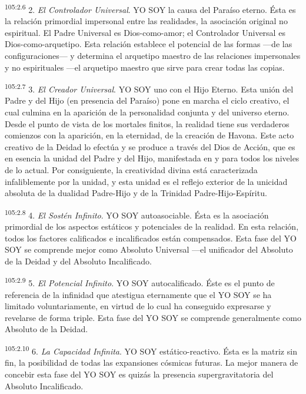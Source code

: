 \par
\textsuperscript{105:2.6} 2. \textit{El Controlador Universal}. YO SOY la causa del Paraíso eterno. Ésta es la relación primordial impersonal entre las realidades, la asociación original no espiritual. El Padre Universal es Dios-como-amor; el Controlador Universal es Dios-como-arquetipo. Esta relación establece el potencial de las formas ---de las configuraciones--- y determina el arquetipo maestro de las relaciones impersonales y no espirituales ---el arquetipo maestro que sirve para crear todas las copias.

\par
\textsuperscript{105:2.7} 3. \textit{El Creador Universal}. YO SOY uno con el Hijo Eterno. Esta unión del Padre y del Hijo (en presencia del Paraíso) pone en marcha el ciclo creativo, el cual culmina en la aparición de la personalidad conjunta y del universo eterno. Desde el punto de vista de los mortales finitos, la realidad tiene sus verdaderos comienzos con la aparición, en la eternidad, de la creación de Havona. Este acto creativo de la Deidad lo efectúa y se produce a través del Dios de Acción, que es en esencia la unidad del Padre y del Hijo, manifestada en y para todos los niveles de lo actual. Por consiguiente, la creatividad divina está caracterizada infaliblemente por la unidad, y esta unidad es el reflejo exterior de la unicidad absoluta de la dualidad Padre-Hijo y de la Trinidad Padre-Hijo-Espíritu.

\par
\textsuperscript{105:2.8} 4. \textit{El Sostén Infinito}. YO SOY autoasociable. Ésta es la asociación primordial de los aspectos estáticos y potenciales de la realidad. En esta relación, todos los factores calificados e incalificados están compensados. Esta fase del YO SOY se comprende mejor como Absoluto Universal ---el unificador del Absoluto de la Deidad y del Absoluto Incalificado.

\par
\textsuperscript{105:2.9} 5. \textit{El Potencial Infinito}. YO SOY autocalificado. Éste es el punto de referencia de la infinidad que atestigua eternamente que el YO SOY se ha limitado voluntariamente, en virtud de lo cual ha conseguido expresarse y revelarse de forma triple. Esta fase del YO SOY se comprende generalmente como Absoluto de la Deidad.

\par
\textsuperscript{105:2.10} 6. \textit{La Capacidad Infinita}. YO SOY estático-reactivo. Ésta es la matriz sin fin, la posibilidad de todas las expansiones cósmicas futuras. La mejor manera de concebir esta fase del YO SOY es quizás la presencia supergravitatoria del Absoluto Incalificado.

